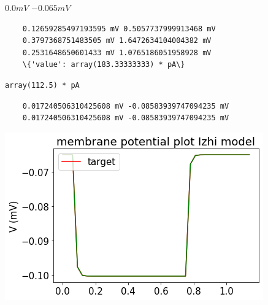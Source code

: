     $0.0 mV$ $-0.065 mV$

    \begin{verbatim}
    0.12659285497193595 mV 0.5057737999913468 mV
    0.3797368751483505 mV 1.6472634104004382 mV
    0.2531648650601433 mV 1.0765186051958928 mV
    \{'value': array(183.33333333) * pA\}
    \end{verbatim}

\begin{verbatim}
array(112.5) * pA
\end{verbatim}


\begin{verbatim}
    0.017240506310425608 mV -0.08583939747094235 mV
    0.017240506310425608 mV -0.08583939747094235 mV
\end{verbatim}

    \begin{center}
    \includegraphics{figures/backend_check_files/backend_check_32_2.png}
    \end{center}
